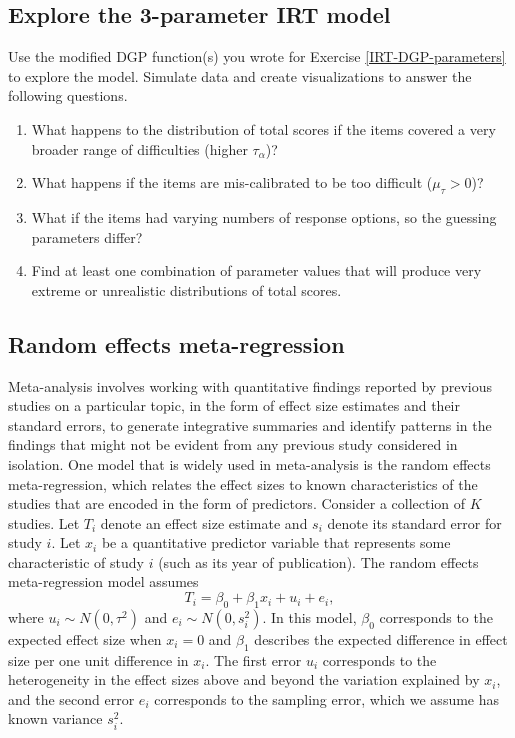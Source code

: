 \documentclass[
]{book}
\providecommand{\tightlist}{%
  \setlength{\itemsep}{0pt}\setlength{\parskip}{0pt}}
\begin{document}
\subsection{Explore the 3-parameter IRT model}\label{IRT-DGP-breaking}

Use the modified DGP function(s) you wrote for Exercise \ref{IRT-DGP-parameters} to explore the model. Simulate data and create visualizations to answer the following questions.

\begin{enumerate}
\def\labelenumi{\arabic{enumi}.}
\tightlist
\item
  What happens to the distribution of total scores if the items covered a very broader range of difficulties (higher \(\tau_\alpha\))?
\item
  What happens if the items are mis-calibrated to be too difficult (\(\mu_\tau > 0\))?
\item
  What if the items had varying numbers of response options, so the guessing parameters differ?
\item
  Find at least one combination of parameter values that will produce very extreme or unrealistic distributions of total scores.
\end{enumerate}

\subsection{Random effects meta-regression}\label{meta-regression-DGP}

Meta-analysis involves working with quantitative findings reported by previous studies on a particular topic, in the form of effect size estimates and their standard errors, to generate integrative summaries and identify patterns in the findings that might not be evident from any previous study considered in isolation.
One model that is widely used in meta-analysis is the random effects meta-regression, which relates the effect sizes to known characteristics of the studies that are encoded in the form of predictors.
Consider a collection of \(K\) studies. Let \(T_i\) denote an effect size estimate and \(s_i\) denote its standard error for study \(i\).
Let \(x_{i}\) be a quantitative predictor variable that represents some characteristic of study \(i\) (such as its year of publication).
The random effects meta-regression model assumes
\[
T_i = \beta_0 + \beta_1 x_i + u_i + e_i,
\]
where \(u_i \sim N(0, \tau^2)\) and \(e_i \sim N(0, s_i^2)\).
In this model, \(\beta_0\) corresponds to the expected effect size when \(x_i = 0\) and \(\beta_1\) describes the expected difference in effect size per one unit difference in \(x_i\).
The first error \(u_i\) corresponds to the heterogeneity in the effect sizes above and beyond the variation explained by \(x_i\), and the second error \(e_i\) corresponds to the sampling error, which we assume has known variance \(s_i^2\).
\end{document}
